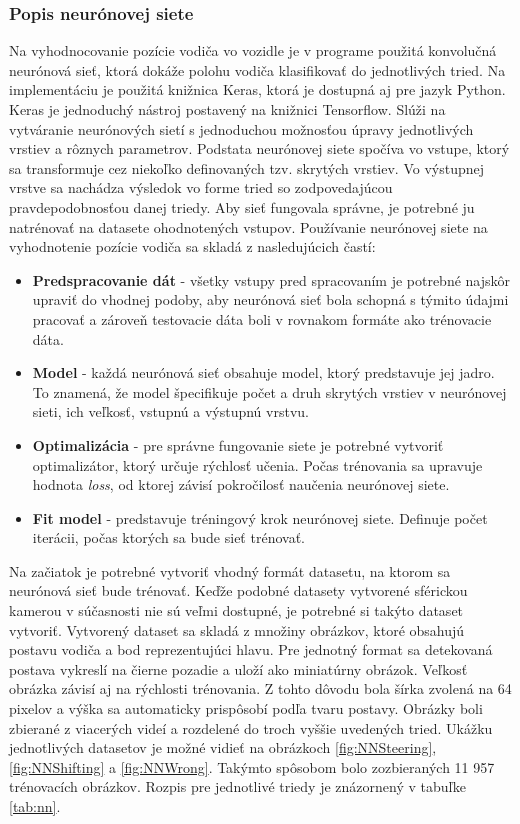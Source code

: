 \documentclass[slovak,master,dept460,male,cpp,cpdeclaration]{diploma}
\begin{document}
\subsubsection*{Popis neurónovej siete}
Na vyhodnocovanie pozície  vodiča vo vozidle je v programe použitá konvolučná neurónová sieť, ktorá dokáže polohu vodiča klasifikovať do jednotlivých tried. Na implementáciu je použitá knižnica Keras, ktorá je dostupná aj pre jazyk Python. Keras je jednoduchý nástroj postavený na knižnici Tensorflow. Slúži na vytváranie neurónových sietí s jednoduchou možnosťou úpravy jednotlivých vrstiev a rôznych parametrov. Podstata neurónovej siete spočíva  vo vstupe, ktorý sa transformuje cez niekoľko definovaných tzv. skrytých vrstiev. Vo výstupnej vrstve sa nachádza výsledok vo forme tried so zodpovedajúcou pravdepodobnosťou danej triedy. Aby  sieť fungovala správne, je potrebné ju natrénovať na  datasete ohodnotených vstupov. Používanie neurónovej siete na vyhodnotenie pozície vodiča sa  skladá z nasledujúcich častí:
\begin{itemize}
\item \textbf{Predspracovanie dát} - všetky vstupy pred spracovaním je potrebné najskôr upraviť do vhodnej podoby, aby neurónová sieť bola schopná s týmito údajmi pracovať a zároveň testovacie dáta boli v rovnakom formáte ako trénovacie dáta. 

\item \textbf{Model} - každá neurónová sieť obsahuje model, ktorý predstavuje jej jadro. To znamená, že model špecifikuje počet a druh skrytých vrstiev v neurónovej sieti, ich veľkosť, vstupnú a výstupnú vrstvu.
\item \textbf{Optimalizácia} - pre správne fungovanie siete je potrebné vytvoriť optimalizátor, ktorý určuje rýchlosť učenia. Počas trénovania sa upravuje hodnota \textit{loss}, od ktorej závisí pokročilosť naučenia neurónovej siete.
\item \textbf{Fit model} - predstavuje tréningový krok neurónovej siete. Definuje počet iterácii, počas ktorých sa bude sieť trénovať.
\end{itemize}

Na začiatok je potrebné vytvoriť vhodný formát datasetu, na ktorom sa neurónová sieť  bude trénovať. Keďže  podobné datasety vytvorené sférickou kamerou v súčasnosti nie sú veľmi dostupné, je potrebné si takýto dataset vytvoriť. Vytvorený dataset  sa skladá z množiny obrázkov, ktoré obsahujú postavu vodiča a bod reprezentujúci hlavu. Pre jednotný format sa detekovaná postava vykreslí na čierne pozadie a uloží ako miniatúrny obrázok. Veľkosť obrázka závisí aj na rýchlosti trénovania. Z tohto dôvodu bola šírka zvolená na 64 pixelov a výška  sa automaticky prispôsobí podľa tvaru postavy. Obrázky boli zbierané z viacerých videí  a rozdelené do troch vyššie uvedených tried. Ukážku jednotlivých datasetov je možné vidieť  na obrázkoch \ref{fig:NNSteering}, \ref{fig:NNShifting}  a \ref{fig:NNWrong}. Takýmto spôsobom bolo zozbieraných 11 957 trénovacích obrázkov. Rozpis pre jednotlivé triedy je  znázornený v tabuľke \ref{tab:nn}.
\end{document}
